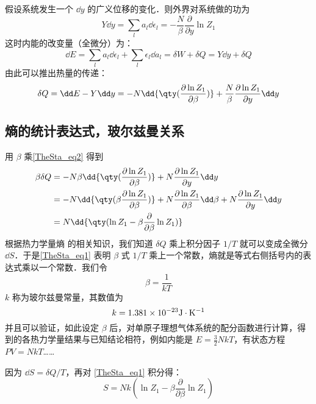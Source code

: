 假设系统发生一个 $\dd y$ 的广义位移的变化．则外界对系统做的功为
\begin{equation}
Y\dd y=\sum_l a_l\dd \epsilon_l=-\frac{N}{\beta}\frac{\partial }{\partial y}\ln Z_1
\end{equation}
这时内能的改变量（全微分）为：
\begin{equation}
\dd E=\sum_l a_l\dd \epsilon_l+\sum_l\epsilon_l\dd a_l=\delta W+\delta Q=Y\dd y+\delta Q
\end{equation}
由此可以推出热量的传递：
\begin{equation}\label{TheSta_eq2}
\delta Q=\dd E-Y\dd y=
-N\dd{\qty(\frac{\partial \ln Z_1}{\partial \beta})}+\frac{N}{\beta}\frac{\partial \ln Z_1}{\partial y}\dd y
\end{equation}
\subsection{熵的统计表达式，玻尔兹曼关系}
用 $\beta$ 乘\autoref{TheSta_eq2} 得到
\begin{equation}\label{TheSta_eq1}
\begin{aligned}
\beta \delta Q&=-N\beta\dd{\qty(\frac{\partial \ln Z_1}{\partial \beta})}+N\frac{\partial \ln Z_1}{\partial y}\dd y\\
&=-N\dd{\qty(\beta\frac{\partial \ln Z_1}{\partial \beta})}+N\frac{\partial \ln Z_1}{\partial \beta}\dd \beta+N\frac{\partial \ln Z_1}{\partial y}\dd y\\
&=N\dd{\qty(\ln Z_1-\beta\frac{\partial }{\partial \beta}\ln Z_1)}
\end{aligned}
\end{equation}
根据热力学量熵 的相关知识，我们知道 $\delta Q$ 乘上积分因子 $1/T$ 就可以变成全微分 $\dd S$．于是\autoref{TheSta_eq1} 表明 $\beta$ 式 $1/T$ 乘上一个常数，熵就是等式右侧括号内的表达式乘以一个常数．我们令
\begin{equation}
\beta=\frac{1}{kT}
\end{equation}
$k$ 称为玻尔兹曼常量，其数值为
\begin{equation}
k=1.381\times 10^{-23} \rm{J\cdot K^{-1}}
\end{equation}
并且可以验证，如此设定 $\beta$ 后，对单原子理想气体系统的配分函数进行计算，得到的各热力学量结果与已知结论相符，例如内能是 $E=\frac{3}{2}NkT$，有状态方程 $PV=NkT$…… 

因为 $\dd S=\delta Q/T$，再对 \autoref{TheSta_eq1} 积分得：
\begin{equation}\label{TheSta_eq3}
S=Nk(\ln Z_1-\beta\frac{\partial }{\partial \beta}\ln Z_1)
\end{equation}

